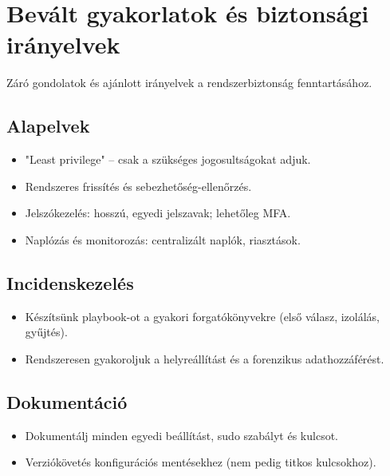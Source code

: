 \section{Bevált gyakorlatok és biztonsági irányelvek}

Záró gondolatok és ajánlott irányelvek a rendszerbiztonság fenntartásához.

\subsection{Alapelvek}
\begin{itemize}
  \item "Least privilege" – csak a szükséges jogosultságokat adjuk.
  \item Rendszeres frissítés és sebezhetőség-ellenőrzés.
  \item Jelszókezelés: hosszú, egyedi jelszavak; lehetőleg MFA.
  \item Naplózás és monitorozás: centralizált naplók, riasztások.
\end{itemize}

\subsection{Incidenskezelés}
\begin{itemize}
  \item Készítsünk playbook-ot a gyakori forgatókönyvekre (első válasz, izolálás, gyűjtés).
  \item Rendszeresen gyakoroljuk a helyreállítást és a forenzikus adathozzáférést.
\end{itemize}

\subsection{Dokumentáció}
\begin{itemize}
  \item Dokumentálj minden egyedi beállítást, sudo szabályt és kulcsot.
  \item Verziókövetés konfigurációs mentésekhez (nem pedig titkos kulcsokhoz).
\end{itemize}
